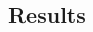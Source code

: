 \documentclass[10pt, letterpaper]{article}
\begin{document}
\begin{spacing}{1.4}

\section*{\large \bf Results}











\end{spacing}
\end{document}
